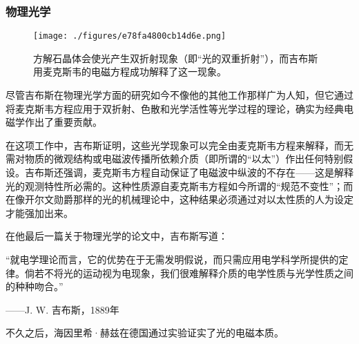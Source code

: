 \subsubsection{物理光学}
\begin{figure}[ht]
\centering
\texttt{[image: ./figures/e78fa4800cb14d6e.png]}
\caption{方解石晶体会使光产生双折射现象（即“光的双重折射”），而吉布斯用麦克斯韦的电磁方程成功解释了这一现象。} \label{fig_QSY_9}
\end{figure}
尽管吉布斯在物理光学方面的研究如今不像他的其他工作那样广为人知，但它通过将麦克斯韦方程应用于双折射、色散和光学活性等光学过程的理论，确实为经典电磁学作出了重要贡献。

在这项工作中，吉布斯证明，这些光学现象可以完全由麦克斯韦方程来解释，而无需对物质的微观结构或电磁波传播所依赖介质（即所谓的“以太”）作出任何特别假设。吉布斯还强调，麦克斯韦方程自动保证了电磁波中纵波的不存在——这是解释光的观测特性所必需的。这种性质源自麦克斯韦方程如今所谓的“规范不变性”；而在像开尔文勋爵那样的光的机械理论中，这种结果必须通过对以太性质的人为设定才能强加出来。

在他最后一篇关于物理光学的论文中，吉布斯写道：

“就电学理论而言，它的优势在于无需发明假说，而只需应用电学科学所提供的定律。倘若不将光的运动视为电现象，我们很难解释介质的电学性质与光学性质之间的种种吻合。”

——J. W. 吉布斯，1889年

不久之后，海因里希·赫兹在德国通过实验证实了光的电磁本质。

